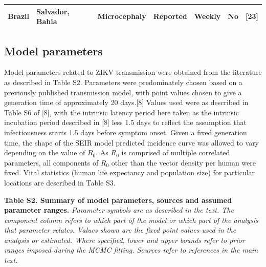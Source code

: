 \documentclass[10pt,letterpaper]{article}
\begin{document}
\begin{longtable}[]{@{}lllllll@{}}
\begin{minipage}[t]{0.03\columnwidth}\raggedright\strut
Brazil\strut
\end{minipage} & \begin{minipage}[t]{0.37\columnwidth}\raggedright\strut
Salvador, Bahia\strut
\end{minipage} & \begin{minipage}[t]{0.08\columnwidth}\raggedright\strut
Microcephaly\strut
\end{minipage} & \begin{minipage}[t]{0.17\columnwidth}\raggedright\strut
Reported\strut
\end{minipage} & \begin{minipage}[t]{0.04\columnwidth}\raggedright\strut
Weekly\strut
\end{minipage} & \begin{minipage}[t]{0.04\columnwidth}\raggedright\strut
No\strut
\end{minipage} & \begin{minipage}[t]{0.08\columnwidth}\raggedright\strut
{[}23{]}\strut
\end{minipage}\tabularnewline
\bottomrule
\end{longtable}

\normalsize

\subsection{Model parameters}\label{model-parameters}

Model parameters related to ZIKV transmission were obtained from the
literature as described in Table S2. Parameters were predominately
chosen based on a previously published transmission model, with point
values chosen to give a generation time of approximately 20 days.{[}8{]}
Values used were as described in Table S6 of {[}8{]}, with the intrinsic
latency period here taken as the intrinsic incubation period described
in {[}8{]} less 1.5 days to reflect the assumption that infectiousness
starts 1.5 days before symptom onset. Given a fixed generation time, the
shape of the SEIR model predicted incidence curve was allowed to vary
depending on the value of \(R_0\). As \(R_0\) is comprised of multiple
correlated parameters, all components of \(R_0\) other than the vector
density per human were fixed. Vital statistics (human life expectancy
and population size) for particular locations are described in Table S3.

\textbf{Table S2. Summary of model parameters, sources and assumed
parameter ranges.} \emph{Parameter symbols are as described in the text.
The component column refers to which part of the model or which part of
the analysis that parameter relates. Values shown are the fixed point
values used in the analysis or estimated. Where specified, lower and
upper bounds refer to prior ranges imposed during the MCMC fitting.
Sources refer to references in the main text.} \tiny
\end{document}
